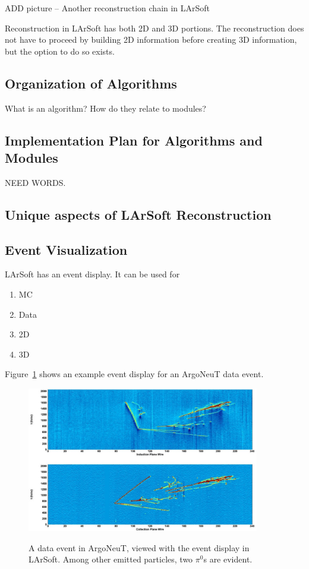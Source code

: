 \documentclass[12pt]{elsarticle}
\begin{document}
ADD picture -- Another reconstruction chain in LArSoft

Reconstruction in LArSoft has both 2D and 3D portions. The reconstruction does not have to proceed by building 2D information before creating 3D information, but the option to do so exists. 

\subsection{Organization of Algorithms}

What is an algorithm? How do they relate to modules?

\subsection{Implementation Plan for Algorithms and Modules}
NEED WORDS.

\subsection{Unique aspects of LArSoft Reconstruction}

\subsection{Event Visualization}
LArSoft has an event display.
It can be used for
\begin{enumerate}
\item{MC}
\item{Data}
\item{2D}
\item{3D}
\end{enumerate}  

Figure~\ref{argo.evd} shows an example event display for an ArgoNeuT data event.

\hspace*{2cm}
\begin{figure}[h]
\centering
\caption{A data event in ArgoNeuT, viewed with the event display in LArSoft. Among other emitted particles, two $\pi^0$s are evident.}
\includegraphics[width=4.0in]{./imgs/ArgoNeuT_event.jpg}
\label{argo.evd}
\end{figure}
\end{document}
